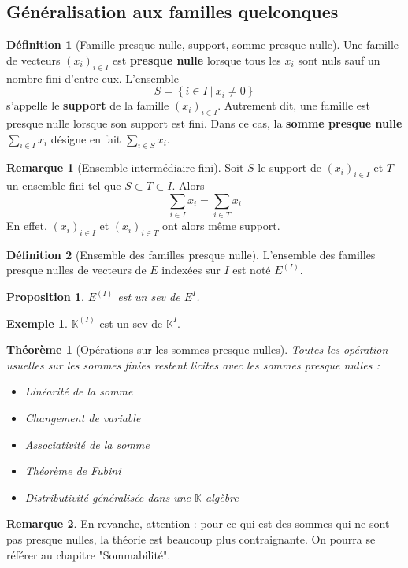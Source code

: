 \documentclass[french]{book}
\newcommand{\K}{\mathbb{K}}
\theoremstyle{plain}
\newtheorem{thm}{Théorème}[chapter]
\newtheorem{prop}{Proposition}[chapter]
\theoremstyle{definition}
\newtheorem{dfn}{Définition}[chapter]
\newtheorem{exa}{Exemple}[chapter]
\newtheorem{rmq}{Remarque}[chapter]
\theoremstyle{remark}
\begin{document}
\subsection{Généralisation aux familles quelconques} %
\begin{dfn}[Famille presque nulle, support, somme presque nulle]
	Une famille de vecteurs $(x_i)_{i\in I}$ est \textbf{presque nulle} lorsque tous les $x_i$ sont nuls sauf un nombre fini d'entre eux. L'ensemble $$S=\left\{i\in I\ | \ x_i\ne0\right\}$$ s'appelle le \textbf{support} de la famille $(x_i)_{i\in I}$. Autrement dit, une famille est presque nulle lorsque son support est fini. Dans ce cas, la \textbf{somme presque nulle} $\displaystyle\sum_{i\in I}x_i$ désigne en fait $\displaystyle\sum_{i\in S}x_i$.
\end{dfn}
\begin{rmq}[Ensemble intermédiaire fini]
	Soit $S$ le support de $(x_i)_{i\in I}$ et $T$ un ensemble fini tel que $S\subset T\subset I$. Alors $$\displaystyle\sum_{i\in I}x_i=\sum_{i\in T}x_i$$ En effet, $(x_i)_{i\in I}$ et $(x_i)_{i\in T}$ ont alors même support.
\end{rmq}
\begin{dfn}[Ensemble des familles presque nulle]
	L'ensemble des familles presque nulles de vecteurs de $E$ indexées sur $I$ est noté $E^{(I)}$.
\end{dfn}
\begin{prop}
	$E^{(I)}$ est un sev de $E^I$.
\end{prop}
\begin{exa}
	$\K^{(I)}$ est un sev de $\K^I$.
\end{exa}
\begin{thm}[Opérations sur les sommes presque nulles]
	Toutes les opération usuelles sur les sommes finies restent licites avec les sommes presque nulles :
	\begin{itemize}
		\item Linéarité de la somme
		\item Changement de variable
		\item Associativité de la somme
		\item Théorème de Fubini
		\item Distributivité généralisée dans une $\K$-algèbre
	\end{itemize}
\end{thm}
\begin{rmq}
	En revanche, attention : pour ce qui est des sommes qui ne sont pas presque nulles, la théorie est beaucoup plus contraignante. On pourra se référer au chapitre "Sommabilité".
\end{rmq}
\end{document}
